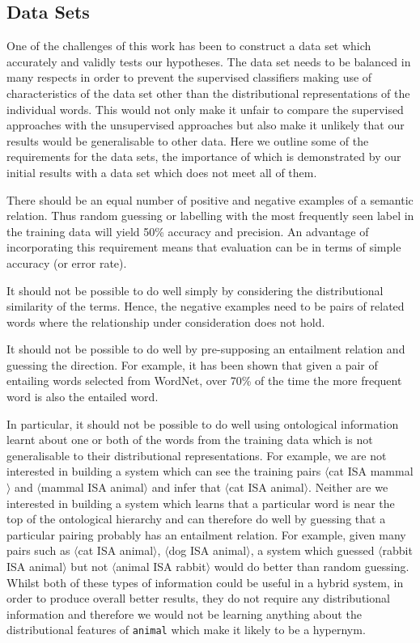 \documentclass[11pt]{article}
\newcommand\pair[2]{$\langle$#1 ISA #2$\rangle$}
\begin{document}
\subsection{Data Sets}

One of the challenges of this work has been to construct a data set which accurately and validly tests our hypotheses.  The data set needs to be balanced in many respects in order to prevent the supervised classifiers making use of characteristics of the data set other than the distributional representations of the individual words.  This would not only make it unfair to compare the supervised approaches with the unsupervised approaches but also make it unlikely that our results would be generalisable to other data.  Here we outline some of the requirements for the data sets, the importance of which is demonstrated by our initial results with a data set which does not meet all of them.

There should be an equal number of positive and negative examples of a semantic relation.  Thus random guessing or labelling with the most frequently seen label in the training data will yield 50\% accuracy and precision.  An advantage of incorporating this requirement means that evaluation can be in terms of simple accuracy (or error rate).

It should not be possible to do well simply by considering the distributional similarity of the terms.  Hence, the negative examples need to be pairs of related words where the relationship under consideration does not hold.

It should not be possible to do well by pre-supposing an entailment relation and guessing the direction.  For example, it has been shown \cite{Weeds2004} that given a pair of entailing words selected from WordNet, over 70\% of the time the more frequent word is also the entailed word.

In particular, it should not be possible to do well using ontological information learnt about one or both of the words from the training data which is not generalisable to their distributional representations.  For example, we are not interested in building a system which can see the training pairs \pair{cat}{mammal} and \pair{mammal}{animal} and infer that \pair{cat}{animal}.  Neither are we interested in building a system which learns that a particular word is near the top of the ontological hierarchy and can therefore do well by guessing that a particular pairing probably has an entailment relation.  For example, given many pairs such as \pair{cat}{animal}, \pair{dog}{animal}, a system which guessed \pair{rabbit}{animal} but not \pair{animal}{rabbit} would do better than random guessing.  Whilst both of these types of information could be useful in a hybrid system, in order to produce overall better results, they do not require any distributional information and therefore we would not be learning anything about the distributional features of \texttt{animal} which make it likely to be a hypernym.
\end{document}
